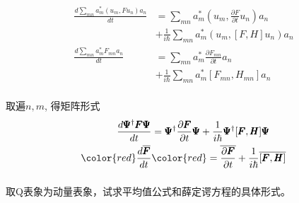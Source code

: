 \begin{frame} 
    \begin{equation*}
        \begin{split}
            \frac{d\sum_{mn}a_m ^* (u_m,Fu_n )a_n}{dt} &=\sum_{mn} a_m ^*  (u_m,\frac{\partial F }{\partial t} u_n)a_n \\  
            &+\frac{1}{i\hbar} \sum_{mn} a_m ^*  ( u_m,[F,H] u_n)a_n  \\  
            \frac{d\sum_{mn}a_m ^* F_{mn}a_n}{dt} &=\sum_{mn} a_m ^*  \frac{\partial F_{mn} }{\partial t}a_n \\  
            &+\frac{1}{i\hbar} \sum_{mn} a_m ^* [F_{mn},H_{mn}]a_n  \\       
        \end{split} 
    \end{equation*}
\end{frame}

\begin{frame} 
    取遍$n,m$, 得矩阵形式
    \begin{equation*}
        \begin{split} 
            \frac{d \pmb \Psi^{\dagger } \pmb F \pmb \Psi}{dt} &=\pmb \Psi^{\dagger } \frac{\partial \pmb F }{\partial t} \pmb \Psi +\frac{1}{i\hbar} \pmb \Psi^{\dagger } [\pmb F, \pmb H] \pmb \Psi \\ \vspace{0.6em}  
           \color{red} \frac{d \overline{\pmb F}}{dt} & \color{red} =\overline{\frac{\partial \pmb F }{\partial t}} +\frac{1}{i\hbar} \overline{ [\pmb F,\pmb H]} \\      
        \end{split} 
    \end{equation*}
\end{frame}

\begin{frame} 
    \frametitle{}
    \begin{tcolorbox}[colback=yellow!5,colframe=yellow!75!black,title=课堂作业]
    取Q表象为动量表象，试求平均值公式和薛定谔方程的具体形式。
    \end{tcolorbox}
\end{frame} 